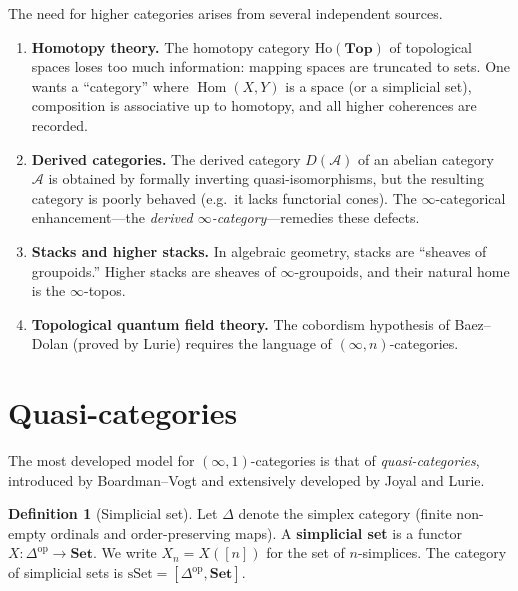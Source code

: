 \documentclass[a4paper,12pt]{book}
\DeclareMathOperator{\Hom}{Hom}
\newcommand{\Set}{\mathbf{Set}}
\newcommand{\Top}{\mathbf{Top}}
\newcommand{\op}{\mathrm{op}}
\theoremstyle{definition}
\newtheorem{definition}{Definition}[section]
\theoremstyle{plain}
\theoremstyle{remark}
\begin{document}

The need for higher categories arises from several independent sources.

\begin{enumerate}[label=(\roman*)]
\item \textbf{Homotopy theory.}
The homotopy category $\mathrm{Ho}(\Top)$ of topological spaces
loses too much information: mapping spaces are truncated to sets.
One wants a ``category'' where $\Hom(X,Y)$ is a space (or a
simplicial set), composition is associative up to homotopy, and
all higher coherences are recorded.

\item \textbf{Derived categories.}
The derived category $D(\mathcal{A})$ of an abelian category~$\mathcal{A}$
is obtained by formally inverting quasi-isomorphisms, but
the resulting category is poorly behaved (e.g.\ it lacks functorial
cones).  The $\infty$-categorical enhancement---the
\emph{derived $\infty$-category}---remedies these defects.

\item \textbf{Stacks and higher stacks.}
In algebraic geometry, stacks are ``sheaves of groupoids.''
Higher stacks are sheaves of $\infty$-groupoids, and their natural
home is the $\infty$-topos.

\item \textbf{Topological quantum field theory.}
The cobordism hypothesis of Baez--Dolan (proved by Lurie) requires
the language of $(\infty,n)$-categories.
\end{enumerate}


\section{Quasi-categories}\label{sec:quasi-categories}


The most developed model for $(\infty,1)$-categories is that of
\emph{quasi-categories}, introduced by Boardman--Vogt and extensively
developed by Joyal and Lurie.

\begin{definition}[Simplicial set]\label{def:simplicial-set-reminder}
Let $\Delta$ denote the simplex category (finite non-empty ordinals and
order-preserving maps).  A \textbf{simplicial set} is a functor
$X\colon\Delta^{\op}\to\Set$.  We write $X_n = X([n])$ for the set of
$n$-simplices.  The category of simplicial sets is
$\mathrm{sSet} = [\Delta^{\op}, \Set]$.
\end{definition}
\end{document}
